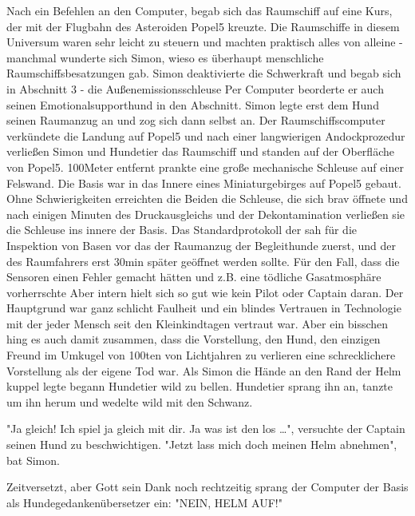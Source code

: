 \documentclass[ebook]{article}
\begin{document}
\noindent Nach ein Befehlen an den Computer, begab sich das
Raumschiff auf eine Kurs, der mit der Flugbahn des Asteroiden Popel5
kreuzte. Die Raumschiffe in diesem Universum waren sehr leicht zu
steuern und machten praktisch alles von alleine - manchmal wunderte
sich Simon, wieso es überhaupt menschliche Raumschiffsbesatzungen
gab. Simon deaktivierte die Schwerkraft und begab sich in Abschnitt
3 - die Außenemissionsschleuse Per Computer beorderte er auch seinen
Emotionalsupporthund in den Abschnitt. Simon legte erst dem Hund
seinen Raumanzug an und zog sich dann selbst an. Der
Raumschiffscomputer verkündete die Landung auf Popel5 und nach einer
langwierigen Andockprozedur verließen Simon und Hundetier das
Raumschiff und standen auf der Oberfläche von Popel5. 100Meter
entfernt prankte eine große mechanische Schleuse auf einer
Felswand. Die Basis war in das Innere eines Miniaturgebirges auf Popel5
gebaut. Ohne Schwierigkeiten erreichten die Beiden die Schleuse, die
sich brav öffnete und nach einigen Minuten des Druckausgleichs und
der Dekontamination verließen sie die Schleuse ins innere der
Basis. Das Standardprotokoll der sah für die Inspektion von Basen
vor das der Raumanzug der Begleithunde zuerst, und der des
Raumfahrers erst 30min später geöffnet werden sollte. Für den Fall,
dass die Sensoren einen Fehler gemacht hätten und z.B. eine tödliche
Gasatmosphäre vorherrschte Aber intern hielt sich so gut wie kein
Pilot oder Captain daran. Der Hauptgrund war ganz schlicht Faulheit
und ein blindes Vertrauen in Technologie mit der jeder Mensch seit
den Kleinkindtagen vertraut war. Aber ein bisschen hing es auch
damit zusammen, dass die Vorstellung, den Hund, den einzigen Freund
im Umkugel von 100ten von Lichtjahren zu verlieren eine
schrecklichere Vorstellung als der eigene Tod war. Als Simon die
Hände an den Rand der Helm kuppel legte begann Hundetier wild zu
bellen. Hundetier sprang ihn an, tanzte um ihn herum und wedelte
wild mit den Schwanz.

\begin{center}
"Ja gleich! Ich spiel ja gleich mit dir. Ja was ist den los \ldots{}",
versuchte der Captain seinen Hund zu beschwichtigen. "Jetzt lass
mich doch meinen Helm abnehmen", bat Simon.
\end{center}

\begin{center}
Zeitversetzt, aber Gott sein Dank noch rechtzeitig sprang der
Computer der Basis als Hundegedankenübersetzer ein: "NEIN, HELM AUF!" 
\end{center}
\end{document}
